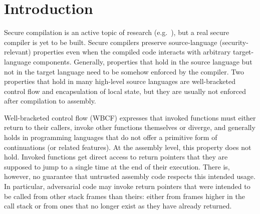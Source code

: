 \documentclass[acmsmall,screen]{acmart}\settopmatter{}
\begin{document}




\maketitle


\renewcommand\lau[1]{{\color{purple} \sf \footnotesize {LS: #1}}\\}
\renewcommand\dominique[1]{{\color{purple} \sf \footnotesize {DD: #1}}\\}
\renewcommand\lars[1]{{\color{purple} \sf \footnotesize {LB: #1}}\\}

\section{Introduction}
\label{sec:introduction}
Secure compilation is an active topic of research (e.g.~\citep{devriese_modular_2017,patrignani_hyper_2017,Abate:2018:GCG:3243734.3243745,new_universal_embedding_2016,juglaret_beyond_2016, patrignani_2019}), but a real secure compiler is yet to be built.
Secure compilers preserve source-language (security-relevant) properties even when the compiled code interacts with arbitrary target-language components.
Generally, properties that hold in the source language but not in the target language need to be somehow enforced by the compiler.
Two properties that hold in many high-level source languages are well-bracketed control flow and encapsulation of local state, but they are usually not enforced after compilation to assembly.

Well-bracketed control flow (WBCF) expresses that invoked functions must either return to their callers, invoke other functions themselves or diverge, and generally holds in programming languages that do not offer a primitive form of continuations (or related features). 
At the assembly level, this property does not hold. 
Invoked functions get direct access to return pointers that they are supposed to jump to a single time at the end of their execution.
There is, however, no guarantee that untrusted assembly code respects this intended usage.
In particular, adversarial code may invoke return pointers that were intended to be called from other stack frames than theirs: either from frames higher in the call stack or from ones that no longer exist as they have already returned. 
\end{document}
